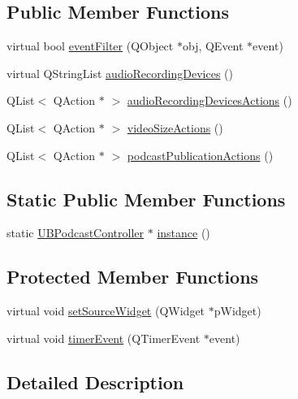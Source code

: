 \subsection*{Public Member Functions}
\begin{DoxyCompactItemize}
\item 
virtual bool \hyperlink{class_u_b_podcast_controller_a5503dee1d9766ec061a202202521e49d}{event\-Filter} (Q\-Object $\ast$obj, Q\-Event $\ast$event)
\item 
virtual Q\-String\-List \hyperlink{class_u_b_podcast_controller_aaf68c6c0fa0047b41207f44047e00512}{audio\-Recording\-Devices} ()
\item 
Q\-List$<$ Q\-Action $\ast$ $>$ \hyperlink{class_u_b_podcast_controller_a756a5aa351c2891437d8cade28cbc80c}{audio\-Recording\-Devices\-Actions} ()
\item 
Q\-List$<$ Q\-Action $\ast$ $>$ \hyperlink{class_u_b_podcast_controller_af5d4a2dd1ce30bb2e0e460abc71d0e87}{video\-Size\-Actions} ()
\item 
Q\-List$<$ Q\-Action $\ast$ $>$ \hyperlink{class_u_b_podcast_controller_a8377e5b5d275659767f8189b93947455}{podcast\-Publication\-Actions} ()
\end{DoxyCompactItemize}
\subsection*{Static Public Member Functions}
\begin{DoxyCompactItemize}
\item 
static \hyperlink{class_u_b_podcast_controller}{U\-B\-Podcast\-Controller} $\ast$ \hyperlink{class_u_b_podcast_controller_a8acf4b0bab6aa6ad4846b9044d7fda96}{instance} ()
\end{DoxyCompactItemize}
\subsection*{Protected Member Functions}
\begin{DoxyCompactItemize}
\item 
virtual void \hyperlink{class_u_b_podcast_controller_a72521bbf54117298bc6977a7c94cdf7b}{set\-Source\-Widget} (Q\-Widget $\ast$p\-Widget)
\item 
virtual void \hyperlink{class_u_b_podcast_controller_a6b132ced68f46e2dcad895ff4aad04a9}{timer\-Event} (Q\-Timer\-Event $\ast$event)
\end{DoxyCompactItemize}


\subsection{Detailed Description}


